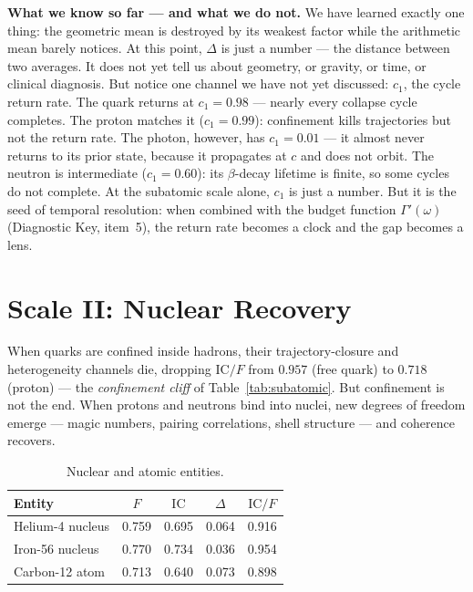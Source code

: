 \documentclass[
  aps,
  prd,
  twocolumn,
  superscriptaddress,
  nofootinbib,
  floatfix
]{revtex4-2}
\newcommand{\Gam}{\Gamma}
\newcommand{\IC}{\mathrm{IC}}
\begin{document}
\textbf{What we know so far --- and what we do not.}
We have learned exactly one thing: the geometric mean is
destroyed by its weakest factor while the arithmetic mean
barely notices.  At this point, $\Delta$ is just a number ---
the distance between two averages.  It does not yet tell us
about geometry, or gravity, or time, or clinical diagnosis.
But notice one channel we have not yet discussed:
$c_1$, the cycle return rate.  The quark returns at
$c_1 = 0.98$ --- nearly every collapse cycle completes.
The proton matches it ($c_1 = 0.99$): confinement kills
trajectories but not the return rate.  The photon,
however, has $c_1 = 0.01$ --- it almost never returns to
its prior state, because it propagates at $c$ and does not
orbit.  The neutron is intermediate ($c_1 = 0.60$): its
$\beta$-decay lifetime is finite, so some cycles do not
complete.  At the subatomic scale alone, $c_1$ is just
a number.  But it is the seed of temporal resolution:
when combined with the budget function $\Gam'(\omega)$
(Diagnostic Key, item~5), the return rate becomes a clock
and the gap becomes a lens.


\section{Scale II: Nuclear Recovery}\label{sec:nuclear}

When quarks are confined inside hadrons, their trajectory-closure
and heterogeneity channels die, dropping $\IC/F$ from $0.957$
(free quark) to $0.718$ (proton) --- the \emph{confinement cliff}
of Table~\ref{tab:subatomic}.  But confinement is not the end.
When protons and neutrons bind into nuclei, new degrees of
freedom emerge --- magic numbers, pairing correlations, shell
structure --- and coherence recovers.

\begin{table}[t]
\caption{\label{tab:nuclear}Nuclear and atomic entities.}
\begin{ruledtabular}
\begin{tabular}{lcccc}
Entity & $F$ & $\IC$ & $\Delta$ & $\IC/F$ \\
\hline
Helium-4 nucleus   & 0.759 & 0.695 & 0.064 & 0.916 \\
Iron-56 nucleus    & 0.770 & 0.734 & 0.036 & 0.954 \\
Carbon-12 atom     & 0.713 & 0.640 & 0.073 & 0.898 \\
\end{tabular}
\end{ruledtabular}
\end{table}
\end{document}
